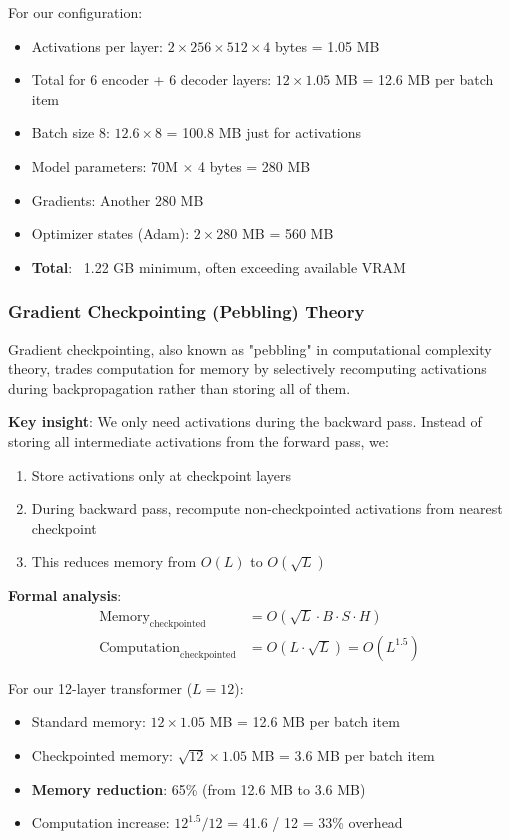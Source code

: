 \documentclass[12pt]{article}
\begin{document}
For our configuration:
\begin{itemize}
\item Activations per layer: $2 \times 256 \times 512 \times 4$ bytes = 1.05 MB
\item Total for 6 encoder + 6 decoder layers: $12 \times 1.05$ MB = 12.6 MB per batch item
\item Batch size 8: $12.6 \times 8$ = 100.8 MB just for activations
\item Model parameters: 70M $\times$ 4 bytes = 280 MB
\item Gradients: Another 280 MB
\item Optimizer states (Adam): $2 \times 280$ MB = 560 MB
\item \textbf{Total}: ~1.22 GB minimum, often exceeding available VRAM
\end{itemize}

\subsubsection{Gradient Checkpointing (Pebbling) Theory}

Gradient checkpointing, also known as "pebbling" in computational complexity theory, trades computation for memory by selectively recomputing activations during backpropagation rather than storing all of them.

\textbf{Key insight}: We only need activations during the backward pass. Instead of storing all intermediate activations from the forward pass, we:
\begin{enumerate}
\item Store activations only at checkpoint layers
\item During backward pass, recompute non-checkpointed activations from nearest checkpoint
\item This reduces memory from $O(L)$ to $O(\sqrt{L})$
\end{enumerate}

\textbf{Formal analysis}:
\begin{align}
\text{Memory}_{\text{checkpointed}} &= O(\sqrt{L} \cdot B \cdot S \cdot H) \\
\text{Computation}_{\text{checkpointed}} &= O(L \cdot \sqrt{L}) = O(L^{1.5})
\end{align}

For our 12-layer transformer ($L=12$):
\begin{itemize}
\item Standard memory: $12 \times 1.05$ MB = 12.6 MB per batch item
\item Checkpointed memory: $\sqrt{12} \times 1.05$ MB = 3.6 MB per batch item
\item \textbf{Memory reduction}: 65\% (from 12.6 MB to 3.6 MB)
\item Computation increase: $12^{1.5} / 12$ = 41.6 / 12 = 33\% overhead
\end{itemize}
\end{document}
